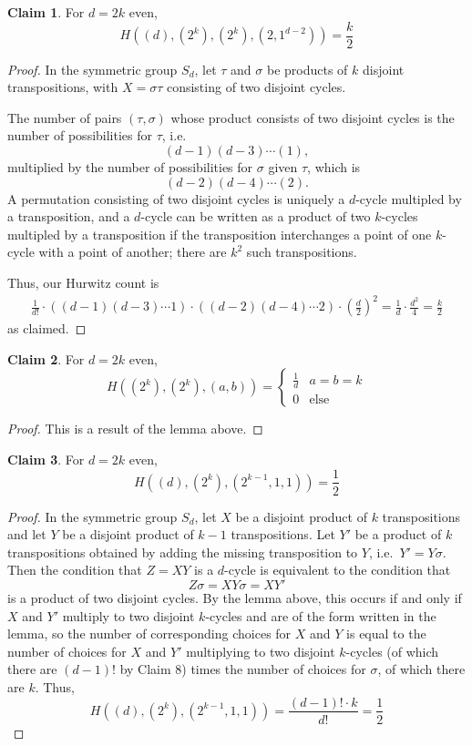 \documentclass[11pt]{article}           %
\theoremstyle{definition}
\newtheorem{claim}{Claim}[section]
\begin{document}
\begin{claim}
  \label{claim:twoscomplete}
For $d=2k$ even,
\[
H((d),(2^k),(2^k),(2,1^{d-2}))=\frac k2
\]
\end{claim}
\begin{proof}
  In the symmetric group $S_d$, let $\tau$ and $\sigma$
  be products of $k$ disjoint transpositions, with $X=\sigma\tau$ consisting
  of two disjoint cycles.

  
  The number of pairs $(\tau,\sigma)$ whose product consists of two
  disjoint cycles is the number of possibilities for $\tau$, i.e.
  \[
  (d-1)(d-3)\cdots (1),
  \]
  multiplied by the number of possibilities for $\sigma$ given $\tau$, which is
  \[
  (d-2)(d-4)\cdots (2).\]
  A permutation consisting of two disjoint cycles
  is uniquely a $d$-cycle multipled by a transposition, and
  a $d$-cycle can be written as a product of two $k$-cycles multipled by a
  transposition if the transposition interchanges a point of one $k$-cycle
  with a point of another; there are $k^2$ such transpositions.

  Thus, our Hurwitz count is
  \begin{align*}
  \frac 1{d!}\cdot ((d-1)(d-3)\cdots 1)\cdot  ((d-2)(d-4)\cdots 2)\cdot\left(\frac d2\right)^2 = \frac{1}{d}\cdot\frac{d^2}{4}=\frac k2
  \end{align*}
  as claimed.
\end{proof}

\begin{claim}
  \label{claim:twoscycles}
  For $d=2k$ even,
  \[
  H((2^k),(2^k),(a,b))=\begin{cases}
  \frac 1d & a=b=k \\
  0 & \text{else}
  \end{cases}
  \]
\end{claim}
\begin{proof}
  This is a result of the lemma above.
  \end{proof}

\begin{claim}
  \label{claim:twoseven}
For $d=2k$ even,
\[
H((d),(2^k),(2^{k-1},1,1))=\frac 12
\]
\end{claim}
\begin{proof}
  In the symmetric group $S_d$, let $X$ be a disjoint product of $k$ transpositions
  and let $Y$ be a disjoint product of $k-1$ transpositions. Let $Y'$ be a product
  of $k$ transpositions obtained by adding the missing transposition to $Y$, i.e.\ $Y'=Y\sigma$.
  Then the condition that $Z=XY$ is a $d$-cycle is equivalent to the condition that
  \[
  Z\sigma=XY\sigma=XY'
  \]
  is a product of two disjoint cycles. By the lemma above,
  this occurs if and only if $X$ and $Y'$ multiply to two disjoint $k$-cycles and are of
  the form written in the lemma, so the number of corresponding choices
  for $X$ and $Y$ is equal to the number of choices for $X$ and $Y'$ multiplying
  to two disjoint $k$-cycles (of which there are $(d-1)!$ by Claim 8) times the number
  of choices for $\sigma$, of which there are $k$. Thus,
  \[
  H((d),(2^k),(2^{k-1},1,1))=\frac{(d-1)!\cdot k}{d!}=\frac 12
  \]
  
  \end{proof}
\end{document}
